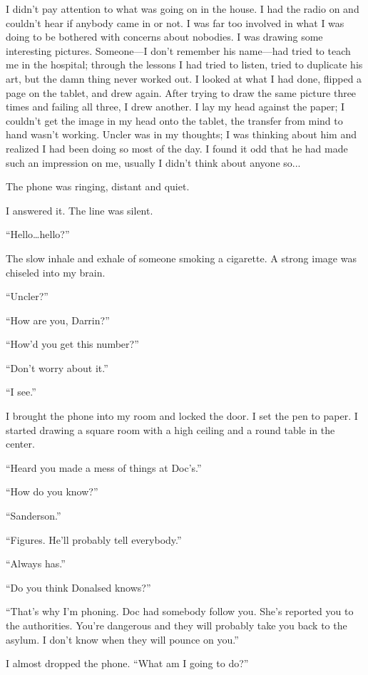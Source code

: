 I didn't pay attention to what was going on in the house. I had the
radio on and couldn't hear if anybody came in or not. I was far too
involved in what I was doing to be bothered with concerns about
nobodies. I was drawing some interesting pictures. Someone---I don't
remember his name---had tried to teach me in the hospital; through the
lessons I had tried to listen, tried to duplicate his art, but the damn
thing never worked out. I looked at what I had done, flipped a page on
the tablet, and drew again. After trying to draw the same picture three
times and failing all three, I drew another. I lay my head against the
paper; I couldn't get the image in my head onto the tablet, the transfer
from mind to hand wasn't working. Uncler was in my thoughts; I was
thinking about him and realized I had been doing so most of the day. I
found it odd that he had made such an impression on me, usually I didn't
think about anyone so...

The phone was ringing, distant and quiet.

I answered it. The line was silent.

``Hello\ldots hello?''

The slow inhale and exhale of someone smoking a cigarette. A strong
image was chiseled into my brain.

``Uncler?''

``How are you, Darrin?''

``How'd you get this number?''

``Don't worry about it.''

``I see.''

I brought the phone into my room and locked the door. I set the pen to
paper. I started drawing a square room with a high ceiling and a round
table in the center.

``Heard you made a mess of things at Doc's.''

``How do you know?''

``Sanderson.''

``Figures. He'll probably tell everybody.''

``Always has.''

``Do you think Donalsed knows?''

``That's why I'm phoning. Doc had somebody follow you. She's reported
you to the authorities. You're dangerous and they will probably take you
back to the asylum. I don't know when they will pounce on you.''

I almost dropped the phone. ``What am I going to do?''

